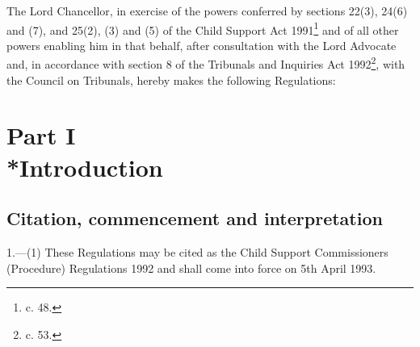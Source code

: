 \documentclass[12pt,a4paper]{article}
\title{\regstitle}
\author{S.I. 1992 No. 2640}
\date{Made 26th October 1992\\Laid before Parliament 29th October 1992\\Coming into force 5th April 1993}
\begin{document}
\maketitle

\noindent
The Lord Chancellor, in exercise of the powers conferred by sections 22(3), 24(6) and (7), and 25(2), (3) and (5) of the Child Support Act 1991\footnote{ c. 48.} and of all other powers enabling him in that behalf, after consultation with the Lord Advocate and, in accordance with section 8 of the Tribunals and Inquiries Act 1992\footnote{ c. 53.}, with the Council on Tribunals, hereby makes the following Regulations:

{\sloppy

\tableofcontents

}

\setcounter{secnumdepth}{-2}

\section[Part I --- Introduction]{Part I\\*Introduction}

\subsection[1. Citation, commencement and interpretation]{Citation, commencement and interpretation}

\renewcommand\parthead{--- Part I}

1.—(1) These Regulations may be cited as the Child Support Commissioners (Procedure) Regulations 1992 and shall come into force on 5th April 1993.
\end{document}
